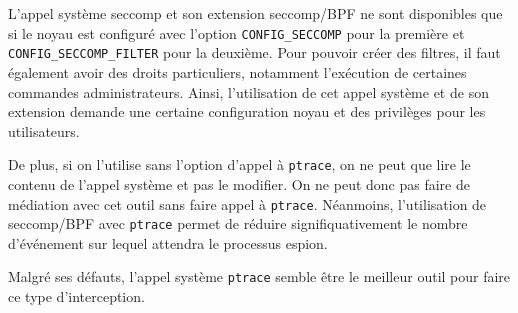 L'appel système seccomp et son extension seccomp/BPF ne sont disponibles que si
le noyau est configuré avec l'option \texttt{CONFIG\_SECCOMP} pour la première
et \texttt{CONFIG\_SECCOMP\_FILTER} pour la deuxième. Pour pouvoir créer des
filtres, il faut également avoir des droits particuliers, notamment l'exécution
de certaines commandes administrateurs. Ainsi, l'utilisation de cet appel
système et de son extension demande une certaine configuration noyau et des
privilèges pour les utilisateurs.

De plus, si on l'utilise sans l'option d'appel à \texttt{ptrace}, on ne peut que
lire le contenu de l'appel système et pas le modifier. On ne peut donc pas faire
de médiation avec cet outil sans faire appel à \texttt{ptrace}. Néanmoins,
l'utilisation de seccomp/BPF avec \texttt{ptrace} permet de réduire
signifiquativement le nombre d'événement sur lequel attendra le processus
espion.
\vspace{0.5cm}

Malgré ses défauts, l'appel système \texttt{ptrace} semble être le meilleur
outil pour faire ce type d'interception.

